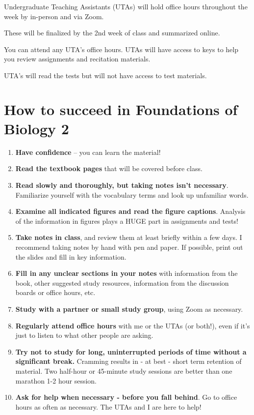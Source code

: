 \documentclass[
]{book}
\providecommand{\tightlist}{%
  \setlength{\itemsep}{0pt}\setlength{\parskip}{0pt}}
\begin{document}
Undergraduate Teaching Assistants (UTAs) will hold office hours throughout the week by in-person and via Zoom.

These will be finalized by the 2nd week of class and summarized online.

You can attend any UTA's office hours. UTAs will have access to keys to help you review assignments and recitation materials.

UTA's will read the tests but will not have access to test materials.

\hypertarget{success}{%
\chapter{How to succeed in Foundations of Biology 2}\label{success}}

\begin{enumerate}
\def\labelenumi{\arabic{enumi}.}
\tightlist
\item
  \textbf{Have confidence} -- you can learn the material!\\
\item
  \textbf{Read the textbook pages} that will be covered before class.
\item
  \textbf{Read slowly and thoroughly, but taking notes isn't necessary}. Familiarize yourself with the vocabulary terms and look up unfamiliar words.
\item
  \textbf{Examine all indicated figures and read the figure captions}. Analysis of the information in figures plays a HUGE part in assignments and tests!
\item
  \textbf{Take notes in class}, and review them at least briefly within a few days. I recommend taking notes by hand with pen and paper. If possible, print out the slides and fill in key information.
\item
  \textbf{Fill in any unclear sections in your notes} with information from the book, other suggested study resources, information from the discussion boards or office hours, etc.
\item
  \textbf{Study with a partner or small study group}, using Zoom as necessary.
\item
  \textbf{Regularly attend office hours} with me or the UTAs (or both!), even if it's just to listen to what other people are asking.
\item
  \textbf{Try not to study for long, uninterrupted periods of time without a significant break.} Cramming results in - at best - short term retention of material. Two half-hour or 45-minute study sessions are better than one marathon 1-2 hour session.
\item
  \textbf{Ask for help when necessary - before you fall behind}. Go to office hours as often as necessary. The UTAs and I are here to help!
\end{enumerate}
\end{document}
